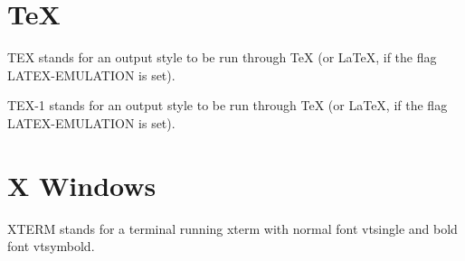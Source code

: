 \section{TeX}

\begin{description} 
\item[TEX]  
TEX stands for an output style to be run through TeX
(or LaTeX, if the flag LATEX-EMULATION is set).

\item[TEX-1]  
TEX-1 stands for an output style to be run through TeX
(or LaTeX, if the flag LATEX-EMULATION is set).
\item
\end{description}

\section{X Windows}

\begin{description} 
\item[XTERM]  
XTERM stands for a terminal running xterm with normal font 
vtsingle and bold font vtsymbold.
\item
\end{description}
